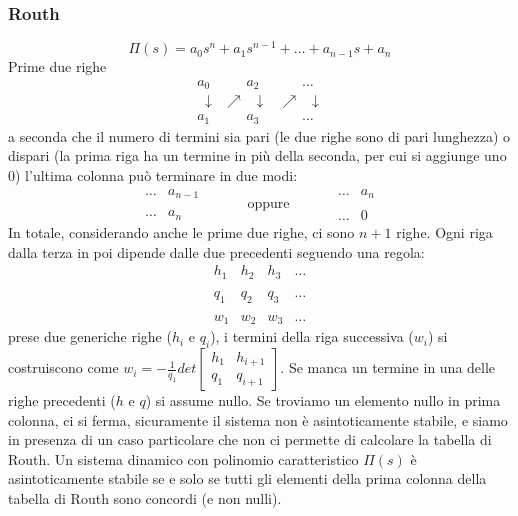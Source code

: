 \begin{landscape}
\begin{multicols*}{3}
    \subsubsection*{Routh}
    \[
        \Pi(s) = a_0s^n + a_1 s^{n-1} + \dots + a_{n-1}s + a_n
    \]
    Prime due righe
    \[
        \begin{matrix}
            a_0 & \;\;\;\;\;\; a_2 & \;\;\;\;\;\;\dots\\
            \;\;\downarrow & \nearrow \;\; \downarrow & \nearrow \;\; \downarrow\\
            a_1 & \;\;\;\;\;\; a_3 & \;\;\;\;\;\;\dots 
        \end{matrix}
    \]
    a seconda che il numero di termini sia pari (le due righe sono di pari lunghezza) o dispari (la prima riga ha un termine in più della seconda, per cui si aggiunge uno $0$) l'ultima colonna può terminare in due modi:
    \[
        \begin{matrix}
            \dots & a_{n-1}\\
            \;\\
            \dots & a_n
        \end{matrix}\;\;\;\;\;\;\;\;\;\;\; \text{oppure}\;\;\;\;\;\;\;\;\;\;\; \begin{matrix}
            \dots &a_n\\
            \;\\
            \dots & 0 
        \end{matrix}
    \]
    In totale, considerando anche le prime due righe, ci sono $n+1$ righe.\newline
    Ogni riga dalla terza in poi dipende dalle due precedenti seguendo una regola:
    \[
        \begin{matrix}
            h_1 & h_2 & h_3 &\dots\\
            \;\\
            q_1 & q_2 & q_3 & \dots\\
            \;\\
            w_1 & w_2 & w_3 & \dots
        \end{matrix}
    \]
    prese due generiche righe ($h_i$ e $q_i$), i termini della riga successiva ($w_i$) si costruiscono come $w_i = - \frac{1}{q_1} det\left[\begin{matrix}
        h_1 & h_{i+1} \\
        q_1 & q_{i+1}
    \end{matrix}\right]$.\newline
    Se manca un termine in una delle righe precedenti ($h$ e $q$) si assume nullo.\newline
    Se troviamo un elemento nullo in prima colonna, ci si ferma, sicuramente il sistema non è asintoticamente stabile, e siamo in presenza di un caso particolare che non ci permette di calcolare la tabella di Routh.\newline
    \newline
    Un sistema dinamico con polinomio caratteristico $\Pi(s)$ è asintoticamente stabile se e solo se tutti gli elementi della prima colonna della tabella di Routh sono concordi (e non nulli).

\end{multicols*}
\end{landscape}
